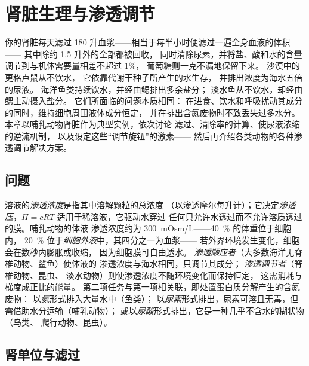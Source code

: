 \chapter{肾脏生理与渗透调节}\label{ch:b3:renal-osmoregulation}

你的肾脏每天滤过 180 升血浆——相当于每半小时便滤过一遍全身血液的体积——
其中除约 1.5 升外的全部都被回收，
同时清除尿素，并将盐、酸和水的含量调节到与机体需要量相差不超过 1\%，
葡萄糖则一克不漏地保留下来。
沙漠中的更格卢鼠从不饮水，
它依靠代谢干种子所产生的水生存，
并排出浓度为海水五倍的尿液。
海洋鱼类持续饮水，并经由鳃排出多余盐分；
淡水鱼从不饮水，却经由鳃主动摄入盐分。
它们所面临的问题本质相同：
在进食、饮水和呼吸扰动其成分的同时，维持细胞周围液体成分恒定，
并在排出含氮废物时不致丢失过多水分。
本章以哺乳动物肾脏作为典型实例，依次讨论
滤过、清除率的计算、使尿液浓缩的逆流机制，
以及设定这些“调节旋钮”的激素——
然后再介绍各类动物的各种渗透调节解决方案。

\section{问题}

\begin{definition}[渗透调节]\label{def:b3:renal-osmoregulation:problem}
溶液的\emph{渗透浓度}是指其中溶解颗粒的总浓度
（以渗透摩尔每升计）；它决定\emph{渗透
压}，$\Pi = cRT$ 适用于稀溶液，它驱动水穿过
任何只允许水透过而不允许溶质透过的膜。哺乳动物的体液
渗透浓度约为 \qty{300}{mOsm/L}——\qty{40}{\%} 的体重位于细胞内，
\qty{20}{\%} 位于\emph{细胞外液}中，其四分之一为血浆——
若外界环境发生变化，细胞会在数秒内膨胀或收缩，
因为细胞膜可自由透水。
\emph{渗透顺应者}（大多数海洋无脊椎动物、鲨鱼）使体液的
渗透浓度与海水相同，只调节其成分；
\emph{渗透调节者}（脊椎动物、昆虫、
淡水动物）则使渗透浓度不随环境变化而保持恒定，
这需消耗与梯度成正比的能量。
第二项任务与第一项相关联，即处置蛋白质分解产生的含氮废物：
以\emph{氨}形式排入大量水中（鱼类）；
以\emph{尿素}形式排出，尿素可溶且无毒，但需借助水分运输（哺乳动物）；
或以\emph{尿酸}形式排出，它是一种几乎不含水的糊状物（鸟类、
爬行动物、昆虫）。
\end{definition}

\section{肾单位与滤过}

